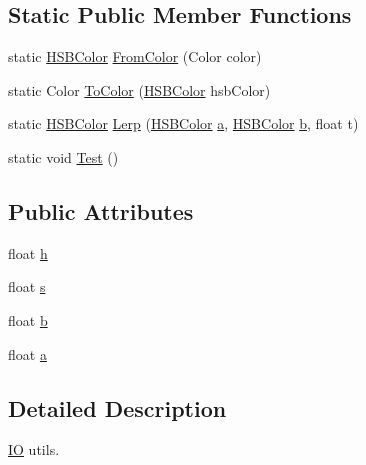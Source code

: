 \subsection*{Static Public Member Functions}
\begin{DoxyCompactItemize}
\item 
static \hyperlink{struct_mikkeo_1_1_colour_1_1_h_s_b_color}{H\+S\+B\+Color} \hyperlink{struct_mikkeo_1_1_colour_1_1_h_s_b_color_aa2b92e6866e6f245373fa983733d1cbc}{From\+Color} (Color color)
\item 
static Color \hyperlink{struct_mikkeo_1_1_colour_1_1_h_s_b_color_a83e2fd36054c7a7b53d4fb2de3b3570b}{To\+Color} (\hyperlink{struct_mikkeo_1_1_colour_1_1_h_s_b_color}{H\+S\+B\+Color} hsb\+Color)
\item 
static \hyperlink{struct_mikkeo_1_1_colour_1_1_h_s_b_color}{H\+S\+B\+Color} \hyperlink{struct_mikkeo_1_1_colour_1_1_h_s_b_color_a327b2b6d6cd031b21056a7e9a08a8d74}{Lerp} (\hyperlink{struct_mikkeo_1_1_colour_1_1_h_s_b_color}{H\+S\+B\+Color} \hyperlink{struct_mikkeo_1_1_colour_1_1_h_s_b_color_a9042c66e979e55cd1b6e04e64470e468}{a}, \hyperlink{struct_mikkeo_1_1_colour_1_1_h_s_b_color}{H\+S\+B\+Color} \hyperlink{struct_mikkeo_1_1_colour_1_1_h_s_b_color_afed08c1798d410979a8fbef3787384e5}{b}, float t)
\item 
static void \hyperlink{struct_mikkeo_1_1_colour_1_1_h_s_b_color_aaeefffc802f9183f81b1bf5ce503e749}{Test} ()
\end{DoxyCompactItemize}
\subsection*{Public Attributes}
\begin{DoxyCompactItemize}
\item 
float \hyperlink{struct_mikkeo_1_1_colour_1_1_h_s_b_color_a02a8b048ad3e20a748c5caa27d11273e}{h}
\item 
float \hyperlink{struct_mikkeo_1_1_colour_1_1_h_s_b_color_ab7d0e76376413147a3d5b26f8ed5da1a}{s}
\item 
float \hyperlink{struct_mikkeo_1_1_colour_1_1_h_s_b_color_afed08c1798d410979a8fbef3787384e5}{b}
\item 
float \hyperlink{struct_mikkeo_1_1_colour_1_1_h_s_b_color_a9042c66e979e55cd1b6e04e64470e468}{a}
\end{DoxyCompactItemize}


\subsection{Detailed Description}
\hyperlink{namespace_mikkeo_1_1_i_o}{IO} utils. 



